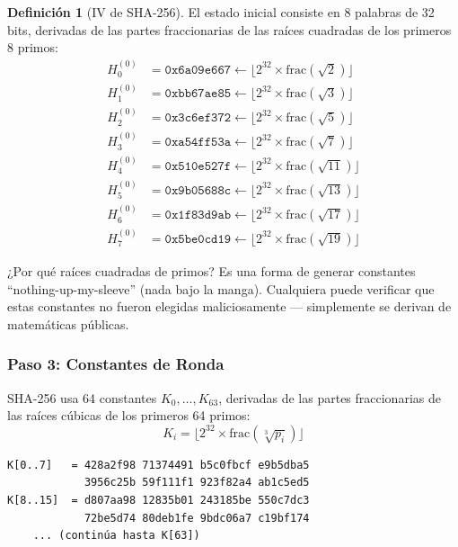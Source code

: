 \documentclass[11pt,a4paper,twoside,openright]{book}
\theoremstyle{definition}
\newtheorem{definition}{Definición}[chapter]
\theoremstyle{plain}
\theoremstyle{remark}
\begin{document}
\begin{definition}[IV de SHA-256]
El estado inicial consiste en 8 palabras de 32 bits, derivadas de las partes fraccionarias de las raíces cuadradas de los primeros 8 primos:
\begin{align}
H_0^{(0)} &= \texttt{0x6a09e667} \leftarrow \lfloor 2^{32} \times \text{frac}(\sqrt{2}) \rfloor \\
H_1^{(0)} &= \texttt{0xbb67ae85} \leftarrow \lfloor 2^{32} \times \text{frac}(\sqrt{3}) \rfloor \\
H_2^{(0)} &= \texttt{0x3c6ef372} \leftarrow \lfloor 2^{32} \times \text{frac}(\sqrt{5}) \rfloor \\
H_3^{(0)} &= \texttt{0xa54ff53a} \leftarrow \lfloor 2^{32} \times \text{frac}(\sqrt{7}) \rfloor \\
H_4^{(0)} &= \texttt{0x510e527f} \leftarrow \lfloor 2^{32} \times \text{frac}(\sqrt{11}) \rfloor \\
H_5^{(0)} &= \texttt{0x9b05688c} \leftarrow \lfloor 2^{32} \times \text{frac}(\sqrt{13}) \rfloor \\
H_6^{(0)} &= \texttt{0x1f83d9ab} \leftarrow \lfloor 2^{32} \times \text{frac}(\sqrt{17}) \rfloor \\
H_7^{(0)} &= \texttt{0x5be0cd19} \leftarrow \lfloor 2^{32} \times \text{frac}(\sqrt{19}) \rfloor
\end{align}
\end{definition}

\begin{intuicion}
¿Por qué raíces cuadradas de primos? Es una forma de generar constantes ``nothing-up-my-sleeve'' (nada bajo la manga). Cualquiera puede verificar que estas constantes no fueron elegidas maliciosamente --- simplemente se derivan de matemáticas públicas.
\end{intuicion}

\subsubsection{Paso 3: Constantes de Ronda}

SHA-256 usa 64 constantes $K_0, \ldots, K_{63}$, derivadas de las partes fraccionarias de las raíces cúbicas de los primeros 64 primos:
\[ K_i = \lfloor 2^{32} \times \text{frac}(\sqrt[3]{p_i}) \rfloor \]

\begin{verbatim}
K[0..7]   = 428a2f98 71374491 b5c0fbcf e9b5dba5 
            3956c25b 59f111f1 923f82a4 ab1c5ed5
K[8..15]  = d807aa98 12835b01 243185be 550c7dc3 
            72be5d74 80deb1fe 9bdc06a7 c19bf174
    ... (continúa hasta K[63])
\end{verbatim}
\end{document}
